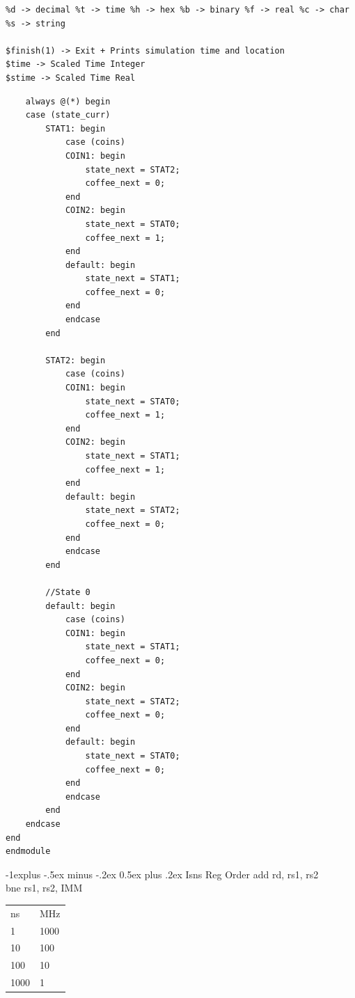 \documentclass[12pt,landscape,a4paper]{article}
\makeatletter
\renewcommand{\subsection}{\@startsection{subsection}{2}{0mm}%
                                {-1explus -.5ex minus -.2ex}%
                                {0.5ex plus .2ex}%
                                {\normalfont\normalsize\bfseries}}
\makeatother
\begin{document}
\begin{multicols}{4}
\begin{tiny}
\begin{verbatim}
%d -> decimal %t -> time %h -> hex %b -> binary %f -> real %c -> char %s -> string

$finish(1) -> Exit + Prints simulation time and location 
$time -> Scaled Time Integer
$stime -> Scaled Time Real
\end{verbatim}
\end{tiny}
\columnbreak
\begin{tiny}
\begin{verbatim}
    always @(*) begin
    case (state_curr)    
        STAT1: begin
            case (coins)
            COIN1: begin
                state_next = STAT2;
                coffee_next = 0;
            end
            COIN2: begin 
                state_next = STAT0;
                coffee_next = 1;
            end
            default: begin 
                state_next = STAT1;
                coffee_next = 0;
            end
            endcase
        end
        
        STAT2: begin
            case (coins)
            COIN1: begin
                state_next = STAT0;
                coffee_next = 1;
            end
            COIN2: begin 
                state_next = STAT1;
                coffee_next = 1;
            end
            default: begin 
                state_next = STAT2;
                coffee_next = 0;
            end
            endcase
        end
        
        //State 0
        default: begin
            case (coins)
            COIN1: begin
                state_next = STAT1;
                coffee_next = 0;
            end
            COIN2: begin 
                state_next = STAT2;
                coffee_next = 0;
            end
            default: begin 
                state_next = STAT0;
                coffee_next = 0;
            end
            endcase
        end
    endcase
end  
endmodule
\end{verbatim}
\end{tiny}
\columnbreak

\subsection{Isns Reg Order}
add rd, rs1, rs2\\
bne rs1, rs2, IMM

\begin{minipage}[t]{\linewidth}
\begin{tabular}{l | l }
    ns & MHz \\
    1 & 1000 \\
    10 & 100 \\
    100 & 10 \\
    1000 & 1 \\
\end{tabular}

\end{minipage}
\end{multicols}
\end{document}
